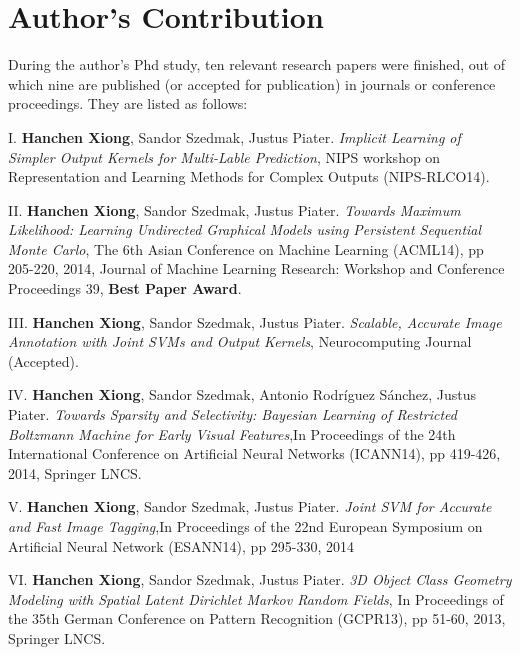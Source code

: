 \section{Author's Contribution}
\label{sec:contribution}
During the author's  Phd study, ten relevant research papers were finished, out of which nine are published (or accepted for publication) in 
journals or conference proceedings. They are listed as follows:     
\begin{shaded}
{\Huge I.} \textbf{Hanchen Xiong}, Sandor Szedmak, Justus Piater. {\it Implicit Learning of Simpler Output Kernels for Multi-Lable Prediction}, NIPS workshop on Representation and Learning Methods for Complex Outputs (NIPS-RLCO14).  
\vspace{-.2cm}

{\Huge II.} \textbf{Hanchen Xiong}, Sandor Szedmak, Justus Piater. {\it Towards Maximum Likelihood: Learning Undirected Graphical Models using Persistent Sequential Monte Carlo}, The 6th Asian Conference on Machine Learning (ACML14), pp 205-220, 2014, Journal of Machine Learning Research: Workshop and Conference Proceedings 39, 
\textbf{Best Paper Award}.    
\vspace{-.2cm}

{\Huge III.} \textbf{Hanchen Xiong}, Sandor Szedmak, Justus Piater. {\it Scalable, Accurate Image Annotation with Joint SVMs and Output Kernels}, Neurocomputing Journal (Accepted).  
\vspace{-.2cm}

{\Huge IV.} \textbf{Hanchen Xiong}, Sandor Szedmak, Antonio Rodr{\'i}guez S{\'a}nchez, Justus Piater. {\it Towards Sparsity and Selectivity: Bayesian Learning of Restricted Boltzmann Machine for Early Visual Features},In Proceedings of the 24th International Conference on Artificial Neural Networks (ICANN14), pp 419-426, 2014, Springer LNCS. 
\vspace{-.2cm}

{\Huge V.} \textbf{Hanchen Xiong}, Sandor Szedmak, Justus Piater. {\it Joint SVM for Accurate and Fast Image Tagging},In Proceedings of the 22nd European Symposium on Artificial Neural Network (ESANN14), 
pp 295-330, 2014
\vspace{-.2cm}


{\Huge VI.} \textbf{Hanchen Xiong}, Sandor Szedmak, Justus Piater. {\it 3D Object Class Geometry Modeling with Spatial Latent Dirichlet Markov Random Fields}, In Proceedings of the 35th German Conference on Pattern Recognition (GCPR13), pp 51-60, 2013,  Springer LNCS.  
\vspace{-.2cm}


\end{shaded}
